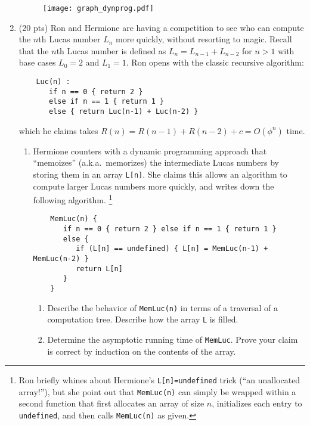 \documentclass[12pt]{article}
\begin{document}
\begin{enumerate}
\begin{figure}[h!]
\begin{center}
\texttt{[image: graph\_dynprog.pdf]} 
\end{center}
\end{figure}


	\item (20 pts) Ron and Hermione are having a competition to see who can compute the $n$th Lucas number $L_{n}$ more quickly, without resorting to magic. Recall that the $n$th Lucas number is defined as $L_{n} = L_{n-1} +L_{n-2}$ for $n>1$ with base cases $L_{0} =2$ and $L_{1} =1$. Ron opens with the classic recursive algorithm:
	\begin{small}
	\begin{verbatim}
	Luc(n) :
	   if n == 0 { return 2 }
	   else if n == 1 { return 1 }
	   else { return Luc(n-1) + Luc(n-2) }
	\end{verbatim}
	\end{small}
	which he claims takes $R(n) = R(n-1) + R(n-2) + c = O(\phi^{n})$ time.
	
	\begin{enumerate}
	\item \label{q:3:memfib} Hermione counters with a dynamic programming approach that ``memoizes'' (a.k.a.\ memorizes) the intermediate Lucas numbers by storing them in an array \verb+L[n]+. She claims this allows an algorithm to compute larger Lucas numbers more quickly, and writes down the following algorithm.%
	\footnote{Ron briefly whines about Hermione's {\tt L[n]=undefined} trick (``an unallocated array!''), but she point out that {\tt MemLuc(n)} can simply be wrapped within a second function that first allocates an array of size $n$, initializes each entry to {\tt undefined}, and then calls {\tt MemLuc(n)} as given.}
	
	\begin{small}
	\begin{verbatim}
	MemLuc(n) {
	   if n == 0 { return 2 } else if n == 1 { return 1 }
	   else {
	      if (L[n] == undefined) { L[n] = MemLuc(n-1) + MemLuc(n-2) }
	      return L[n]
	   }
	}
	\end{verbatim}
	\end{small}
	
	\begin{enumerate}
	\item Describe the behavior of \verb+MemLuc(n)+ in terms of a traversal of a computation tree. Describe how the array \verb+L+ is filled. 
	\item Determine the asymptotic running time of {\tt MemLuc}. Prove your claim is correct by induction on the contents of the array.
	\end{enumerate}
	

\end{enumerate}
\end{enumerate}
\end{document}
